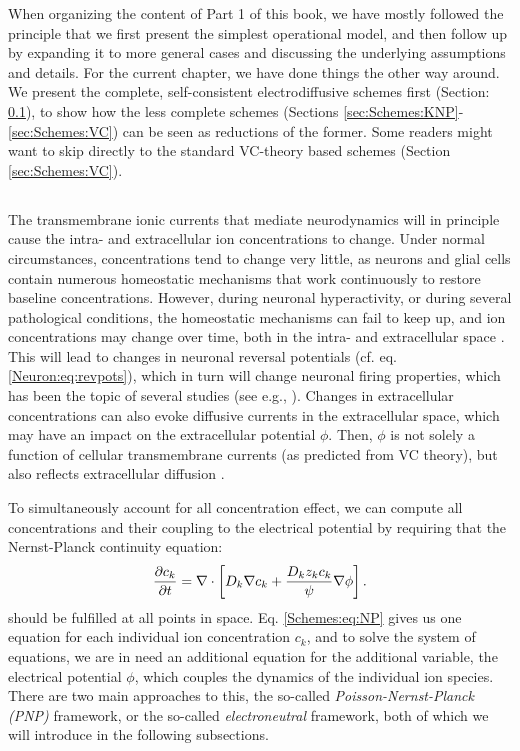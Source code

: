When organizing the content of Part 1 of this book, we have mostly followed the principle that we first present the simplest operational model, and then follow up by expanding it to more general cases and discussing the underlying assumptions and details. For the current chapter, we have done things the other way around. We present the complete, self-consistent electrodiffusive schemes first (Section: \ref{sec:Schemes:complete}), to show how the less complete schemes (Sections \ref{sec:Schemes:KNP}-\ref{sec:Schemes:VC}) can be seen as reductions of the former. 
Some readers might want to skip directly to the standard VC-theory based schemes (Section \ref{sec:Schemes:VC}).



\subsection{}
\label{sec:Schemes:complete}
The transmembrane ionic currents that mediate neurodynamics will in principle cause the intra- and extracellular ion concentrations to change. Under normal circumstances, concentrations tend to change very little, as neurons and glial cells contain numerous homeostatic mechanisms that work continuously to restore baseline concentrations. However, during neuronal hyperactivity, or during several pathological conditions, the homeostatic mechanisms can fail to keep up, and ion concentrations may change over time, both in the intra- and extracellular space  \cite{Dietzel1989, Somjen2001, Frohlich2008, Zandt2015review, Ayata2015}. This will lead to changes in neuronal reversal potentials (cf. eq. \ref{Neuron:eq:revpots}), which in turn will change neuronal firing properties, which has been the topic of several studies (see e.g., \cite{Qian1989, Cressman2009, Oyehaug2009, Zandt2011, Saetra2020}). Changes in extracellular concentrations can also evoke diffusive currents in the extracellular space, which may have an impact on the extracellular potential $\phi$. Then, $\phi$ is not solely a function of cellular transmembrane currents (as predicted from VC theory), but also reflects extracellular diffusion \cite{Halnes2016}. 

To simultaneously account for all concentration effect, we can compute all concentrations and their coupling to the electrical potential by requiring that the Nernst-Planck continuity equation:
\begin{equation}
\frac{\partial c_k}{\partial t} = {\bf \nabla} \cdot \left[{D_k} {\bf \nabla} c_k + \frac{D_k z_k c_k}{\psi} {\bf \nabla} \phi \right].
\label{Schemes:eq:NP}
\end{equation}
should be fulfilled at all points in space. Eq. \ref{Schemes:eq:NP} gives us one equation for each individual ion concentration $c_k$, and to solve the system of equations, we are in need an additional equation for the additional variable, the electrical potential $\phi$, which couples the dynamics of the individual ion species. There are two main approaches to this, the so-called \textit{Poisson-Nernst-Planck (PNP)} framework, or the so-called \textit{electroneutral} framework, both of which we will introduce in the following subsections. 


